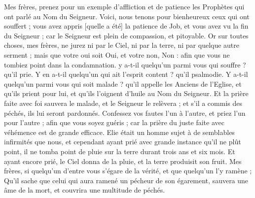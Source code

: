 \begin{multicols}{2}
Mes frères, prenez pour un exemple d'affliction et de patience les Prophètes qui ont parlé au Nom du Seigneur.
Voici, nous tenons pour bienheureux ceux qui ont souffert ; vous avez appris [quelle a été] la patience de Job, et vous avez vu la fin du Seigneur ; car le Seigneur est plein de compassion, et pitoyable.
Or sur toutes choses, mes frères, ne jurez ni par le Ciel, ni par la terre, ni par quelque autre serment ; mais que votre oui soit Oui, et votre non, Non : afin que vous ne tombiez point dans la condamnation.
y a-t-il quelqu'un parmi vous qui souffre ? qu'il prie. Y en a-t-il quelqu'un qui ait l'esprit content ? qu'il psalmodie.
Y a-t-il quelqu'un parmi vous qui soit malade ? qu’il appelle les Anciens de l'Eglise, et qu'ils prient pour lui, et qu'ils l’oignent d'huile au Nom du Seigneur.
Et la prière faite avec foi sauvera le malade, et le Seigneur le relèvera ; et s'il a commis des péchés, ils lui seront pardonnés.
Confessez vos fautes l'un à l'autre, et priez l'un pour l'autre ; afin que vous soyez guéris ; car la prière du juste faite avec véhémence est de grande efficace.
Elie était un homme sujet à de semblables infirmités que nous, et cependant ayant prié avec grande instance qu'il ne plût point, il ne tomba point de pluie sur la terre durant trois ans et six mois.
Et ayant encore prié, le Ciel donna de la pluie, et la terre produisit son fruit.
Mes frères, si quelqu'un d'entre vous s'égare de la vérité, et que quelqu'un l'y ramène ;
Qu'il sache que celui qui aura ramené un pécheur de son égarement, sauvera une âme de la mort, et couvrira une multitude de péchés.
\PPE{}
\end{multicols}
